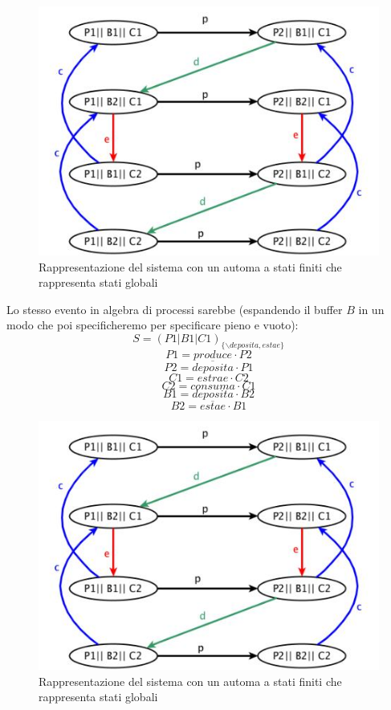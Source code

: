 \documentclass[a4paper,12pt, oneside]{book}
\begin{document}
\begin{esempio}
\begin{center}
  \end{center}
  \begin{figure}[H]
    \centering
    \includegraphics[scale = 0.6]{img/prod3.jpg}
    \caption{Rappresentazione del sistema con un automa a stati finiti che
      rappresenta stati globali}
  \end{figure}
  Lo stesso evento in algebra di processi sarebbe (espandendo il buffer $B$ in
  un modo che poi specificheremo per specificare pieno e vuoto):
  \[S=(P1|B1|C1)_{\{\backslash deposita, estae\}}\]
  \[P1=produce\cdot P2\]
  \[P2=\overline{deposita}\cdot P1\]
  \[C1=estrae\cdot C2\]
  \[C2=consuma\cdot C1\]
  \[B1=deposita\cdot B2\]
  \[B2=\overline{estae}\cdot B1\]
  \begin{figure}[H]
    \centering
    \includegraphics[scale = 0.6]{img/prod3.jpg}
    \caption{Rappresentazione del sistema con un automa a stati finiti che
      rappresenta stati globali}
  \end{figure}
\end{esempio}
\end{document}

